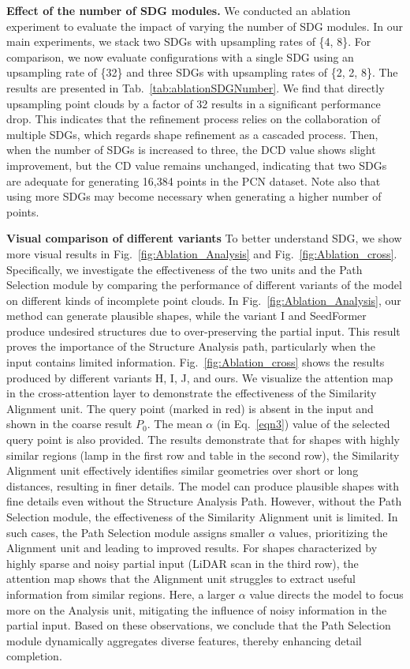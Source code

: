 \noindent\textbf{Effect of the number of SDG modules.} 
We conducted an ablation experiment to evaluate the impact of varying the number of SDG modules. In our main experiments, we stack two SDGs with upsampling rates of \{4, 8\}. For comparison, we now evaluate configurations with a single SDG using an upsampling rate of \{32\} and three SDGs with upsampling rates of \{2, 2, 8\}. The results are presented in Tab.~\ref{tab:ablationSDGNumber}.
% 
We find that directly upsampling point clouds by a factor of 32 results in a significant performance drop.
This indicates that the refinement process relies on the collaboration of multiple SDGs, which regards shape refinement as a cascaded process. 
Then, when the number of SDGs is increased to three, the DCD value shows slight improvement, but the CD value remains unchanged, indicating that two SDGs are adequate for generating 16,384 points in the PCN dataset.
Note also that using more SDGs may become necessary when generating a higher number of points.



\noindent\textbf{Visual comparison of different variants} 
To better understand SDG, we show more visual results in Fig.~\ref{fig:Ablation_Analysis} and Fig.~\ref{fig:Ablation_cross}. 
Specifically, we investigate the effectiveness of the two units and the Path Selection module by comparing the performance of different variants of the model on different kinds of incomplete point clouds. 
In Fig.~\ref{fig:Ablation_Analysis}, our method can generate plausible shapes, while the variant I and SeedFormer produce undesired structures due to over-preserving the partial input. This result proves the importance of the Structure Analysis path, particularly when the input contains limited information. 
% 
Fig.~\ref{fig:Ablation_cross} shows the results produced by different variants H, I, J, and ours.
We visualize the attention map in the cross-attention layer to demonstrate the effectiveness of the Similarity Alignment unit. 
The query point (marked in red) is absent in the input and shown in the coarse result $P_0$. 
The mean $\alpha$ (in Eq.~\ref{eqn3}) value of the selected query point is also provided.
The results demonstrate that for shapes with highly similar regions (lamp in the first row and table in the second row), the Similarity Alignment unit effectively identifies similar geometries over short or long distances, resulting in finer details. The model can produce plausible shapes with fine details even without the Structure Analysis Path. However, without the Path Selection module, the effectiveness of the Similarity Alignment unit is limited. In such cases, the Path Selection module assigns smaller 
$\alpha$ values, prioritizing the Alignment unit and leading to improved results.
For shapes characterized by highly sparse and noisy partial input (LiDAR scan in the third row), the attention map shows that the Alignment unit struggles to extract useful information from similar regions. Here, a larger 
$\alpha$ value directs the model to focus more on the Analysis unit, mitigating the influence of noisy information in the partial input.
Based on these observations, we conclude that the Path Selection module dynamically aggregates diverse features, thereby enhancing detail completion.



